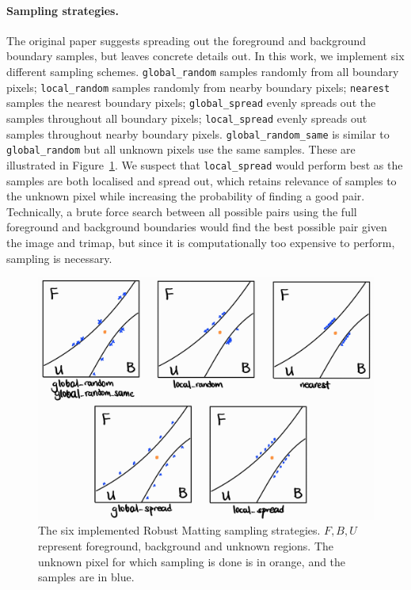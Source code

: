 \documentclass{article}
\theoremstyle{definition}
\begin{document}
\begin{multicols}{2}[]
\paragraph{Sampling strategies.}
The original paper suggests spreading out the foreground and background boundary samples, but leaves concrete details out. In this work, we implement six different sampling schemes. \verb|global_random| samples randomly from all boundary pixels; \verb|local_random| samples randomly from nearby boundary pixels; \verb|nearest| samples the nearest boundary pixels; \verb|global_spread| evenly spreads out the samples throughout all boundary pixels; \verb|local_spread| evenly spreads out samples throughout nearby boundary pixels. \verb|global_random_same| is similar to \verb|global_random| but all unknown pixels use the same samples. These are illustrated in Figure~\ref{fig:sampling}. We suspect that \verb|local_spread| would perform best as the samples are both localised and spread out, which retains relevance of samples to the unknown pixel while increasing the probability of finding a good pair. Technically, a brute force search between all possible pairs using the full foreground and background boundaries would find the best possible pair given the image and trimap, but since it is computationally too expensive to perform, sampling is necessary.
\begin{figure}[H]
    \centering
    \includegraphics[width=0.7\linewidth]{sampling}
    \caption{The six implemented Robust Matting sampling strategies. $F,B,U$ represent foreground, background and unknown regions. The unknown pixel for which sampling is done is in orange, and the samples are in blue.}
    \label{fig:sampling}
\end{figure}


\end{multicols}
\end{document}
